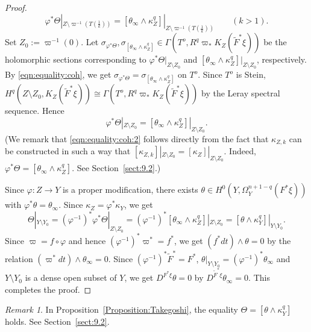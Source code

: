 \documentclass[amscd, leqno]{amsart}
\theoremstyle{plain}
\theoremstyle{definition}
\theoremstyle{remark}
\newtheorem{remark}[theorem]{Remark}
\newenvironment{pf}{\begin{proof}}{\end{proof}}
\begin{document}
\begin{pf}
\begin{equation}
\label{eqn:equality:coh}
\varphi^{*}\Theta|_{Z\setminus\varpi^{-1}(T(\frac{1}{k}))} = [\theta_{\infty}\wedge\kappa_{Z}^{q}]|_{Z\setminus\varpi^{-1}(T(\frac{1}{k}))}
\qquad(k>1).
\end{equation}
Set $Z_{0} := \varpi^{-1}(0)$.
Let $\sigma_{\varphi^{*}\Theta}, \sigma_{ [\theta_{\infty}\wedge\kappa_{Z}^{q}]} \in \Gamma(T^{o}, R^{q}\varpi_{*}K_{Z}(\widetilde{F}^{*}\xi))$ 
be the holomorphic sections corresponding to $\varphi^{*}\Theta|_{Z\setminus Z_{0}}$ and 
$[\theta_{\infty}\wedge\kappa_{Z}^{q}]|_{Z\setminus Z_{0}}$, respectively.
By \eqref{eqn:equality:coh}, we get $\sigma_{\varphi^{*}\Theta} = \sigma_{ [\theta_{\infty}\wedge\kappa_{Z}^{q}]}$ on $T^{o}$.
Since $T^{o}$ is Stein, $H^{q}(Z\setminus Z_{0}, K_{Z}(\widetilde{F}^{*}\xi)) \cong \Gamma(T^{o}, R^{q}\varpi_{*}K_{Z}(\widetilde{F}^{*}\xi))$ 
by the Leray spectral sequence. 
Hence
\begin{equation}
\label{eqn:equality:coh:2}
\varphi^{*}\Theta|_{Z\setminus Z_{0}} = [ \theta_{\infty}\wedge\kappa_{Z}^{q} ] |_{Z\setminus Z_{0}}.
\end{equation}
(We remark that \eqref{eqn:equality:coh:2} follows directly from the fact that $\kappa_{Z,k}$ can be constructed in such a way that 
$[\kappa_{Z,k}]|_{Z\setminus Z_{0}} = [\kappa_{Z}]|_{Z\setminus Z_{0}}$.
Indeed, $\varphi^{*}\Theta=[\theta_{\infty}\wedge\kappa_{Z}^{q}]$. See Section~\ref{sect:9.2}.)
\par
Since $\varphi\colon Z\to Y$ is a proper modification,
there exists $\theta\in H^{0}(Y,\Omega_{Y}^{n+1-q}(F^{*}\xi))$ with $\varphi^{*}\theta = \theta_{\infty}$.
Since $\kappa_{Z}=\varphi^{*}\kappa_{Y}$, we get 
$$
\Theta|_{Y\setminus Y_{0}}
=
(\varphi^{-1})^{*}\varphi^{*}\Theta|_{Z\setminus Z_{0}}
=
(\varphi^{-1})^{*}[\theta_{\infty}\wedge\kappa_{Z}^{q}]|_{Z\setminus Z_{0}}
=
[\theta\wedge\kappa_{Y}^{q}]|_{Y\setminus Y_{0}}.
$$
Since $\varpi = f \circ \varphi$ and hence $(\varphi^{-1})^{*}\varpi^{*} = f^{*}$, we get $(f^{*}dt)\wedge\theta=0$ by the relation 
$(\varpi^{*}dt)\wedge\theta_{\infty}=0$. 
Since $(\varphi^{-1})^{*}\widetilde{F}^{*} = F^{*}$, $\theta|_{Y\setminus Y_{0}} = (\varphi^{-1})^{*}\theta_{\infty}$ and 
$Y\setminus Y_{0}$ is a dense open subset of $Y$, we get $D^{F^{*}\xi}\theta = 0$ by $D^{\widetilde{F}^{*}\xi} \theta_{\infty} =0$. 
This completes the proof.
\end{pf}


\begin{remark}
In Proposition~\ref{Proposition:Takegoshi}, the equality $\Theta=[\theta\wedge\kappa_{Y}^{q}]$ holds. See Section~\ref{sect:9.2}.
\end{remark}
\end{document}
